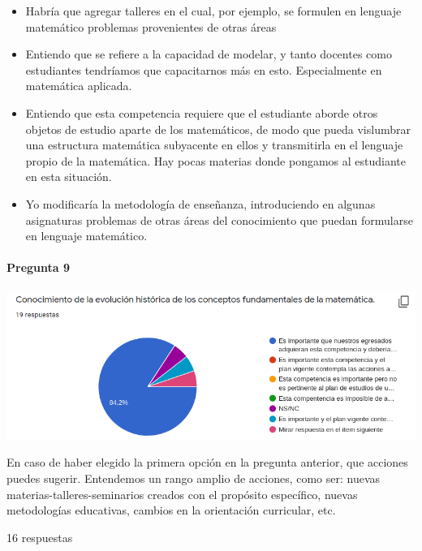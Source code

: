 \documentclass[a4paper,10pt,BCOR10mm,oneside,headsepline]{scrbook}
\begin{document}
\begin{subappendices}
\begin{itemize}
\item Habría que agregar talleres en el cual, por ejemplo, se formulen en lenguaje matemático problemas provenientes de otras áreas

\item Entiendo que se refiere a la capacidad de modelar, y tanto docentes como estudiantes tendríamos que capacitarnos más en esto. Especialmente en matemática aplicada.

\item Entiendo que esta competencia requiere que el estudiante aborde otros objetos de estudio aparte de los matemáticos, de modo que pueda vislumbrar una estructura matemática subyacente en ellos y transmitirla en el lenguaje propio de la matemática. Hay pocas materias donde pongamos al estudiante en esta situación.
 
\item Yo modificaría la metodología de enseñanza, introduciendo en algunas asignaturas problemas de otras áreas del conocimiento que puedan formularse en lenguaje matemático.
  
\end{itemize}




    
  \paragraph{Pregunta 9}
\begin{center}
 
\includegraphics[scale=.9]{doc09.png}
 \end{center}

 En caso de haber elegido la primera opción en la pregunta anterior, que acciones puedes sugerir. Entendemos un rango amplio de acciones, como ser: nuevas materias-talleres-seminarios creados con el propósito específico, nuevas metodologías educativas, cambios en la orientación curricular, etc. 
 
 16 respuestas


\end{subappendices}
\end{document}

